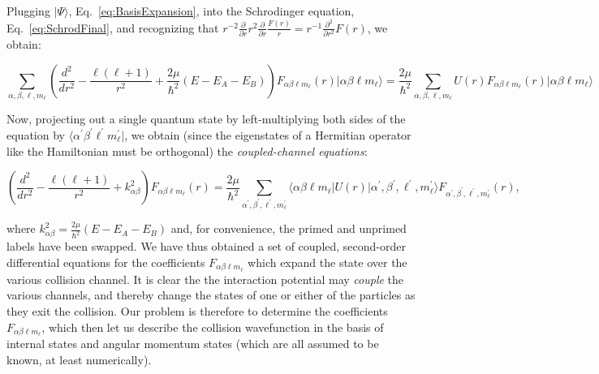 \documentclass[%
 reprint,
 amsmath,amssymb,
 aps,
 nofootinbib
]{revtex4-1}
\begin{document}
Plugging $\lvert \Psi \rangle$, Eq.~\ref{eq:BasisExpansion}, into the Schrodinger equation, Eq.~\ref{eq:SchrodFinal}, and recognizing that $r^{-2} \frac{\partial}{\partial r} r^2 \frac{\partial}{\partial r} \frac{F(r)}{r} = r^{-1} \frac{\partial^2}{\partial r^2} F(r)$, we obtain:

\begin{widetext}
\[
\sum_{\alpha,\beta,\ell,m_\ell} \left(\frac{d^2}{dr^2} - \frac{\ell(\ell+1)}{r^2} + \frac{2 \mu}{\hbar^2}(E-E_A-E_B) \right) F_{\alpha \beta \ell m_\ell}(r)  \lvert \alpha \beta \ell m_\ell \rangle = \frac{2 \mu}{\hbar^2} \sum_{\alpha,\beta,\ell,m_\ell} U(r) F_{\alpha \beta \ell m_\ell}(r)  \lvert \alpha \beta \ell m_\ell \rangle 
\]
\end{widetext}

\noindent Now, projecting out a single quantum state by left-multiplying both sides of the equation by $\langle \alpha^\prime \beta^\prime \ell^\prime m_\ell^\prime \rvert$, we obtain (since the eigenstates of a Hermitian operator like the Hamiltonian must be orthogonal) the \textit{coupled-channel equations}:
\begin{widetext}
\[
 \left(\frac{d^2}{dr^2} - \frac{\ell(\ell+1)}{r^2} + k_{\alpha \beta}^2 \right) F_{\alpha \beta \ell m_\ell}(r) = \frac{2 \mu}{\hbar^2} \sum_{\alpha^\prime,\beta^\prime,\ell^\prime,m_\ell^\prime} \langle \alpha \beta \ell m_\ell \rvert U(r)   \lvert \alpha^\prime,\beta^\prime,\ell^\prime,m_\ell^\prime \rangle F_{\alpha^\prime,\beta^\prime,\ell^\prime,m_\ell^\prime}(r),
 \]
\end{widetext}

\noindent where $k_{\alpha \beta}^2 = \frac{2\mu}{\hbar^2}(E-E_A-E_B)$ and, for convenience, the primed and unprimed labels have been swapped. We have thus obtained a set of coupled, second-order differential equations for the coefficients $F_{\alpha \beta \ell m_\ell}$ which expand the state over the various collision channel. It is clear the the interaction potential may \textit{couple} the various channels, and thereby change the states of one or either of the particles as they exit the collision. Our problem is therefore to determine the coefficients $F_{\alpha \beta \ell m_\ell}$, which then let us describe the collision wavefunction in the basis of internal states and angular momentum states (which are all assumed to be known, at least numerically). 
\end{document}

